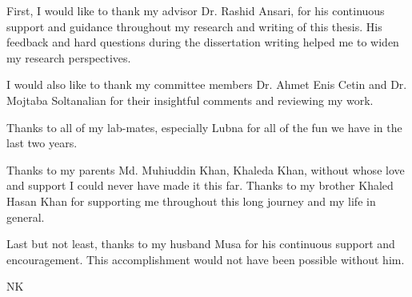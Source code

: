 \acknowledgements

First, I would like to thank my advisor Dr. Rashid Ansari, for his continuous support and guidance throughout my research and writing of this thesis.  
His feedback and hard questions during the dissertation writing helped me to widen my research perspectives.  

I would also like to thank my committee members Dr. Ahmet Enis Cetin and Dr. Mojtaba Soltanalian for their insightful comments and reviewing my work.

Thanks to all of my lab-mates, especially Lubna for all of the fun we have in the last two years. 

Thanks to my parents Md. Muhiuddin Khan, Khaleda Khan, without whose love and support I could never have made it this far. 
Thanks to my brother Khaled Hasan Khan for supporting me throughout this long journey and my life in general.

Last but not least, thanks to my husband Musa for his continuous support and encouragement. This accomplishment would not have been possible without him.


\begin{flushright}
NK
\end{flushright}
